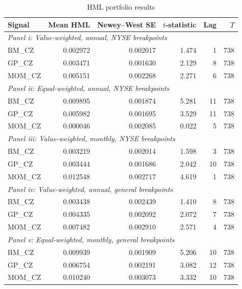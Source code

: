 \begin{table}[H]
  \centering
  \caption{HML portfolio results}
  \label{tab:3c_hml}
  \begin{tabular}{lrrrrr}
    \hline
    Signal & Mean HML & Newey--West SE & $t$-statistic & Lag & $T$ \\
    \hline
    \multicolumn{6}{l}{\textit{Panel i: Value-weighted, annual, NYSE breakpoints}} \\
    BM\_CZ & 0.002972 & 0.002017 & 1.474 & 1 & 738 \\
    GP\_CZ & 0.003471 & 0.001630 & 2.129 & 8 & 738 \\
    MOM\_CZ & 0.005151 & 0.002268 & 2.271 & 6 & 738 \\
    \hline
    \multicolumn{6}{l}{\textit{Panel ii: Equal-weighted, annual, NYSE breakpoints}} \\
    BM\_CZ & 0.009895 & 0.001874 & 5.281 & 11 & 738 \\
    GP\_CZ & 0.005982 & 0.001695 & 3.529 & 11 & 738 \\
    MOM\_CZ & 0.000046 & 0.002085 & 0.022 & 5 & 738 \\
    \hline
    \multicolumn{6}{l}{\textit{Panel iii: Value-weighted, monthly, NYSE breakpoints}} \\
    BM\_CZ & 0.003219 & 0.002014 & 1.598 & 3 & 738 \\
    GP\_CZ & 0.003444 & 0.001686 & 2.042 & 10 & 738 \\
    MOM\_CZ & 0.012548 & 0.002717 & 4.619 & 1 & 738 \\
    \hline
    \multicolumn{6}{l}{\textit{Panel iv: Value-weighted, annual, general breakpoints}} \\
    BM\_CZ & 0.003438 & 0.002439 & 1.410 & 8 & 738 \\
    GP\_CZ & 0.004335 & 0.002092 & 2.072 & 7 & 738 \\
    MOM\_CZ & 0.007482 & 0.002910 & 2.571 & 4 & 738 \\
    \hline
    \multicolumn{6}{l}{\textit{Panel v: Equal-weighted, monthly, general breakpoints}} \\
    BM\_CZ & 0.009939 & 0.001909 & 5.206 & 10 & 738 \\
    GP\_CZ & 0.006754 & 0.002191 & 3.082 & 12 & 738 \\
    MOM\_CZ & 0.010240 & 0.003073 & 3.332 & 10 & 738 \\
    \hline
  \end{tabular}
\end{table}

